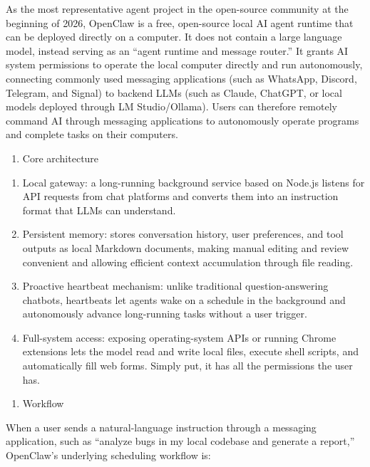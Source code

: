 As the most representative agent project in the open-source community at the beginning of 2026, OpenClaw is a free, open-source local AI agent runtime that can be deployed directly on a computer. It does not contain a large language model, instead serving as an ``agent runtime and message router.'' It grants AI system permissions to operate the local computer directly and run autonomously, connecting commonly used messaging applications (such as WhatsApp, Discord, Telegram, and Signal) to backend LLMs (such as Claude, ChatGPT, or local models deployed through LM Studio/Ollama). Users can therefore remotely command AI through messaging applications to autonomously operate programs and complete tasks on their computers.

\begin{enumerate}
\def\labelenumi{(\Roman{enumi})}
\tightlist
\item
  Core architecture
\end{enumerate}

\begin{enumerate}
\def\labelenumi{\arabic{enumi}.}
\item
  Local gateway: a long-running background service based on Node.js listens for API requests from chat platforms and converts them into an instruction format that LLMs can understand.
\item
  Persistent memory: stores conversation history, user preferences, and tool outputs as local Markdown documents, making manual editing and review convenient and allowing efficient context accumulation through file reading.
\item
  Proactive heartbeat mechanism: unlike traditional question-answering chatbots, heartbeats let agents wake on a schedule in the background and autonomously advance long-running tasks without a user trigger.
\item
  Full-system access: exposing operating-system APIs or running Chrome extensions lets the model read and write local files, execute shell scripts, and automatically fill web forms. Simply put, it has all the permissions the user has.
\end{enumerate}

\begin{enumerate}
\def\labelenumi{(\Roman{enumi})}
\setcounter{enumi}{1}
\tightlist
\item
  Workflow
\end{enumerate}

When a user sends a natural-language instruction through a messaging application, such as ``analyze bugs in my local codebase and generate a report,'' OpenClaw's underlying scheduling workflow is:


